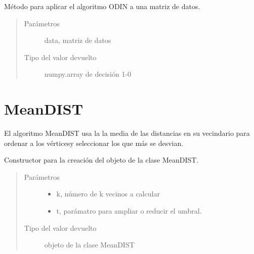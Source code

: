 \documentclass[letterpaper,10pt,spanish]{sphinxmanual}
\begin{document}

\begin{fulllineitems}
Método para aplicar el algoritmo ODIN a una matriz de datos.
\begin{quote}\begin{description}
\item[{Parámetros}] \leavevmode
{} \textendash{} data, matriz de datos

\item[{Tipo del valor devuelto}] \leavevmode
numpy.array de decisión 1-0

\end{description}\end{quote}

\end{fulllineitems}



\chapter{MeanDIST}
\label{\detokenize{index:meandist}}
El algoritmo MeanDIST usa la la media de las distancias en su vecindario
para ordenar a los vérticesy seleccionar los que más se desvian.

\begin{fulllineitems}
\label{\detokenize{index:MeanDIST}}
Constructor para la creación del objeto de la clase MeanDIST.
\begin{quote}\begin{description}
\item[{Parámetros}] \leavevmode\begin{itemize}
\item {} 
 \textendash{} k, número de k vecinos a calcular

\item {} 
 \textendash{} t, parámatro para ampliar o reducir el umbral.

\end{itemize}

\item[{Tipo del valor devuelto}] \leavevmode
objeto de la clase MeanDIST

\end{description}\end{quote}

\end{fulllineitems}
\end{document}
